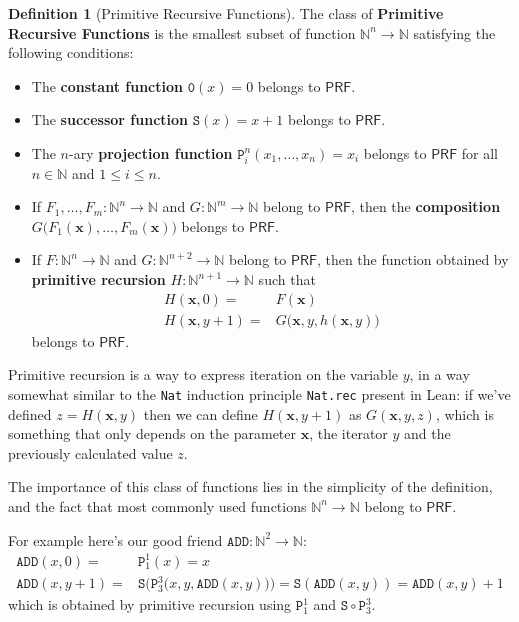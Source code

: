 \documentclass{book}
\theoremstyle{definition}
\newtheorem{definition}{Definition}
\theoremstyle{remark}
\theoremstyle{plain}
\newcommand{\NN}{\mathbb{N}}
\newcommand{\PRF}{\mathsf{PRF}}
\newcommand{\prZero}{\mathtt{0}}
\newcommand{\prSucc}{\mathtt{S}}
\newcommand{\prProj}[2]{\mathtt{P}^{#1}_{#2}} %
\newcommand{\pradd}{\mathtt{ADD}}
\begin{document}
\begin{definition}[Primitive Recursive Functions]
The class of \textbf{Primitive Recursive Functions} is the smallest subset of function $\NN^n \to \NN$ satisfying the following conditions:
\begin{itemize}
\item The \textbf{constant function} $\prZero(x) = 0$ belongs to $\PRF$.
\item The \textbf{successor function} $\prSucc(x) = x+1$ belongs to $\PRF$.
\item The $n$-ary \textbf{projection function} $\prProj{n}{i}(x_1, \dots, x_n) = x_i$ belongs to $\PRF$
for all $n \in \NN$ and $1 \le i \le n$.
\item If $F_1, \dots, F_m : \NN^n \to \NN$ and $G : \NN^m \to \NN$ belong to $\PRF$,
then the \textbf{composition} $G \big( F_1(\boldsymbol{x}), \dots, F_m(\boldsymbol{x}) \big)$ belongs to $\PRF$.
\item If $F:\NN^n \to \NN$ and $G:\NN^{n+2} \to \NN$ belong to $\PRF$,
then the function obtained by \textbf{primitive recursion} $H:\NN^{n+1} \to \NN$ such that
\begin{align*}
  H(\boldsymbol{x}, 0)   = & F(\boldsymbol{x}) \\
  H(\boldsymbol{x}, y+1) = & G \big( \boldsymbol{x}, y, h(\boldsymbol{x}, y) \big)
\end{align*}
belongs to $\PRF$.
\end{itemize}
\end{definition}

Primitive recursion is a way to express iteration on the variable $y$,
in a way somewhat similar to the \lstinline{Nat} induction principle \lstinline{Nat.rec} present in Lean:
if we've defined $z=H(\boldsymbol{x},y)$ then we can define $H(\boldsymbol{x},y+1)$ as $G(\boldsymbol{x},y,z)$,
which is something that only depends on the parameter $\boldsymbol{x}$, the iterator $y$ and the previously calculated value $z$.

The importance of this class of functions lies in the simplicity of the definition,
and the fact that most commonly used functions $\NN^n \to \NN$ belong to $\PRF$.

For example here's our good friend $\pradd : \NN^2 \to \NN$:
\begin{align*}
  \pradd(x, 0)   = & \prProj{1}{1}(x) = x \\
  \pradd(x, y+1) = & \prSucc \big( \prProj{3}{3} \big( x,y,\pradd(x,y) \big) \big) = \prSucc(\pradd(x,y)) = \pradd(x,y)+1
\end{align*}
which is obtained by primitive recursion using $\prProj{1}{1}$ and $\prSucc \circ \prProj{3}{3}$.
\end{document}
